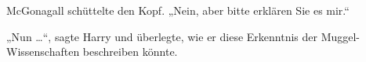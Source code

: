McGonagall schüttelte den Kopf.
„Nein, aber bitte erklären Sie es mir.“

„Nun …“, sagte Harry und überlegte, wie er diese Erkenntnis der Muggel-Wissenschaften beschreiben könnte.
